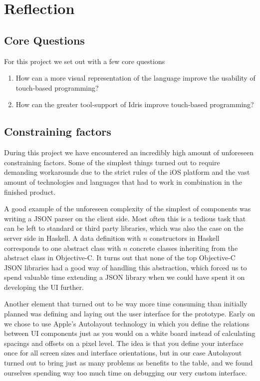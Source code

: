 \section{Reflection}
\label{sec:Reflection}

\subsection{Core Questions}
For this project we set out with a few core questions 

\begin{enumerate}
	\item How can a more visual representation of the language improve the usability of touch-based programming?
	\item How can the greater tool-support of Idris improve touch-based programming?
\end{enumerate}


\subsection{Constraining factors}
During this project we have encountered an incredibly high amount of unforeseen constraining factors. Some of the simplest things turned out to require demanding workarounds due to the strict rules of the iOS platform and the vast amount of technologies and languages that had to work in combination in the finished product.

A good example of the unforeseen complexity of the simplest of components was writing a JSON parser on the client side. Most often this is a tedious task that can be left to standard or third party libraries, which was also the case on the server side in Haskell. A data definition with $n$ constructors in Haskell corresponds to one abstract class with $n$ concrete classes inheriting from the abstract class in Objective-C. It turns out that none of the top Objective-C JSON libraries had a good way of handling this abstraction, which forced us to spend valuable time extending a JSON library when we could have spent it on developing the UI further.

Another element that turned out to be way more time consuming than initially planned was defining and laying out the user interface for the prototype. Early on we chose to use Apple's Autolayout technology in which you define the relations between UI components just as you would on a white board instead of calculating spacings and offsets on a pixel level. The idea is that you define your interface once for all screen sizes and interface orientations, but in our case Autolayout turned out to bring just as many problems as benefits to the table, and we found ourselves spending way too much time on debugging our very custom interface.

